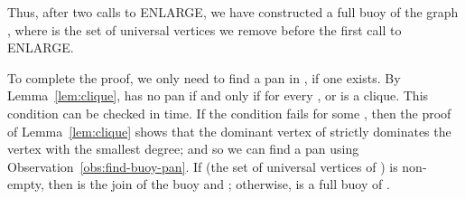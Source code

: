 \documentclass[11pt,a4paper]{article}
\newenvironment{proof}{\noindent {\it Proof:~}}{\hfill \smallskip\par}
\begin{document}
\begin{proof}
Thus, after two calls to ENLARGE, we have constructed a full buoy
 of the graph , where  is the set of universal
vertices we remove before the first call to ENLARGE.



To complete the proof, we only need to find a pan in , if one
exists. By Lemma~\ref{lem:clique},  has no pan if and only if
for every ,  or  is a
clique. This condition can be checked in  time. If the
condition fails for some , then the proof of
Lemma~\ref{lem:clique} shows that the dominant vertex  of 
strictly dominates the vertex  with the smallest
degree; and so we can find a pan using
Observation~\ref{obs:find-buoy-pan}. If  (the set of universal
vertices of ) is non-empty, then  is the join of the buoy  and ; otherwise,  is a full buoy of .
\end{proof}
\end{document}
